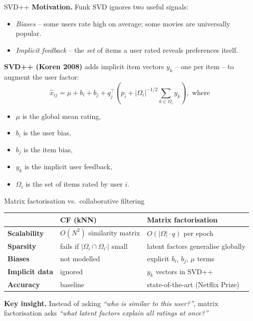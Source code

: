 \documentclass[aspectratio=169,t]{beamer}
\begin{document}
\begin{frame}{SVD++}
  \textbf{Motivation.} Funk SVD ignores two useful signals:
  \begin{itemize}
    \item \emph{Biases} -- some users rate high on average; some movies are universally popular.
    \item \emph{Implicit feedback} -- the \emph{set} of items a user rated reveals preferences itself.
  \end{itemize}

  \textbf{SVD++ (Koren 2008)} adds implicit item vectors $y_k$ -- one per item -- to augment the user factor:
  $$\hat x_{ij} = \mu + b_i + b_j + q_j^\top\!\!\left(p_i + |\Omega_i|^{-1/2}\!\!\sum_{k\in \Omega_i}\!\! y_k\right)\!, \text{ where}$$
  \begin{itemize}
    \item $\mu$ is the global mean rating,
    \item $b_i$ is the user bias,
    \item $b_j$ is the item bias,
    \item $y_k$ is the implicit user feedback,
    \item $\Omega_i$ is the set of items rated by user $i$.
  \end{itemize}
\end{frame}

\begin{frame}{Matrix factorisation vs.\ collaborative filtering}
  \begin{center}
  \renewcommand{\arraystretch}{1.35}
  \begin{tabular}{lll}
    \toprule
    & \textbf{CF (kNN)} & \textbf{Matrix factorisation} \\
    \midrule
    \textbf{Scalability}   & $O(N^2)$ similarity matrix  & $O(|\Omega|\cdot q)$ per epoch \\
    \textbf{Sparsity}      & fails if $|\Omega_i \cap \Omega_{i'}|$ small & latent factors generalise globally \\
    \textbf{Biases}        & not modelled & explicit $b_i$, $b_j$, $\mu$ terms \\
    \textbf{Implicit data} & ignored & $y_k$ vectors in SVD++ \\
    \textbf{Accuracy}      & baseline & state-of-the-art (Netflix Prize) \\
    \bottomrule
  \end{tabular}
  \end{center}

  \vspace{0.25cm}
  \textbf{Key insight.} Instead of asking \emph{``who is similar to this user?''}, matrix factorisation asks \emph{``what latent factors explain all ratings at once?''}
\end{frame}
\end{document}
